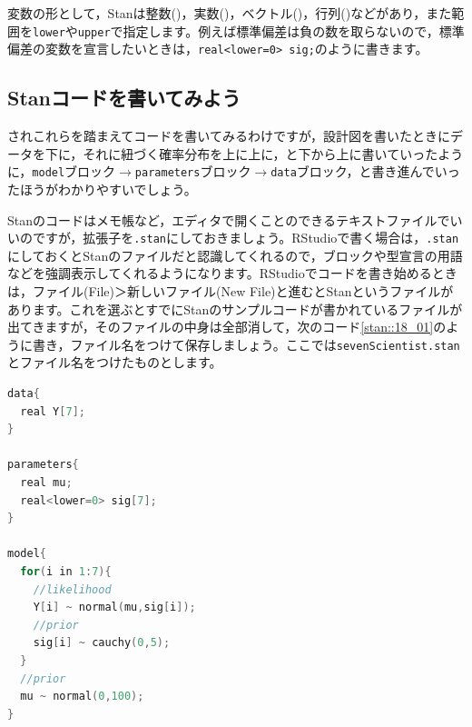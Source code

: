 \documentclass{ltjsbook}
\begin{document}
変数の形として，Stanは整数()，実数()，ベクトル()，行列()などがあり，また範囲を\texttt{lower}や\texttt{upper}で指定します。例えば標準偏差は負の数を取らないので，標準偏差の変数を宣言したいときは，\verb|real<lower=0> sig;|のように書きます。
\subsection{Stanコードを書いてみよう}
されこれらを踏まえてコードを書いてみるわけですが，設計図を書いたときにデータを下に，それに紐づく確率分布を上に上に，と下から上に書いていったように，\texttt{model}ブロック$\to$\texttt{parameters}ブロック$\to$\texttt{data}ブロック，と書き進んでいったほうがわかりやすいでしょう。

Stanのコードはメモ帳など，エディタで開くことのできるテキストファイルでいいのですが，拡張子を\texttt{.stan}にしておきましょう。RStudioで書く場合は，\texttt{.stan}にしておくとStanのファイルだと認識してくれるので，ブロックや型宣言の用語などを強調表示してくれるようになります。RStudioでコードを書き始めるときは，ファイル(File)＞新しいファイル(New File)と進むとStanというファイルがあります。これを選ぶとすでにStanのサンプルコードが書かれているファイルが出てきますが，そのファイルの中身は全部消して，次のコード\ref{stan::18_01}のように書き，ファイル名をつけて保存しましょう。ここでは\texttt{sevenScientist.stan} とファイル名をつけたものとします。

\begin{lstlisting}[language=C++,label={stan::18_01},caption={7人の科学者コード}]
data{
  real Y[7];
}

parameters{
  real mu;
  real<lower=0> sig[7];
}

model{
  for(i in 1:7){
    //likelihood
    Y[i] ~ normal(mu,sig[i]);
    //prior
    sig[i] ~ cauchy(0,5);
  }
  //prior
  mu ~ normal(0,100);
}

\end{lstlisting}
\end{document}
